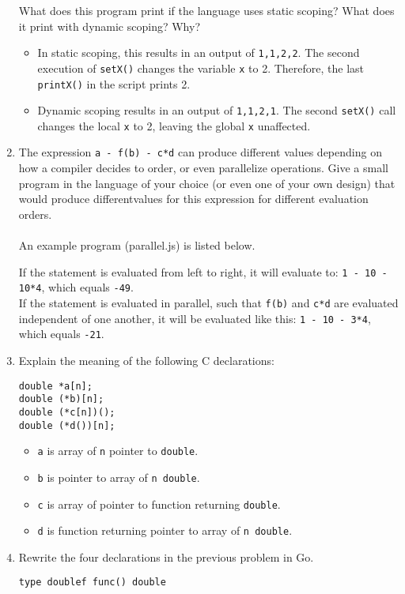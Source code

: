 \documentclass{article}
\begin{document}
\begin{enumerate}
What does this program print if the language uses static scoping? What does it print with dynamic scoping? Why? \\
\begin{itemize}
\item In static scoping, this results in an output of \texttt{1,1,2,2}. The second execution of \texttt{setX()} changes the variable \texttt{x} to 2. Therefore, the last \texttt{printX()} in the script prints 2. 
\item Dynamic scoping results in an output of \texttt{1,1,2,1}. The second \texttt{setX()} call changes the local \texttt{x} to 2, leaving the global \texttt{x} unaffected.
\end{itemize}
\pagebreak
\item The expression \texttt{a - f(b) - c*d} can produce different values depending on how a compiler decides to order, or even parallelize operations.  Give a small program in the language of your choice (or even one of your own design) that would produce differentvalues for this expression for different evaluation orders. \\\\
An example program (parallel.js) is listed below.

If the statement is evaluated from left to right, it will evaluate to: \texttt{1 - 10 - 10*4}, which equals \texttt{-49}. \\
If the statement is evaluated in parallel, such that \texttt{f(b)} and \texttt{c*d} are evaluated independent of one another,  it will be evaluated like this: \texttt{1 - 10 - 3*4}, which equals \texttt{-21}.
\pagebreak
\item Explain the meaning of the following C declarations:
\begin{verbatim}
double *a[n];  
double (*b)[n];
double (*c[n])();
double (*d())[n];
\end{verbatim}
\begin{itemize}
    \item \texttt{a} is array of \texttt{n} pointer to \texttt{double}.
    \item \texttt{b} is pointer to array of \texttt{n double}.
    \item \texttt{c} is array of pointer to function returning \texttt{double}.
    \item \texttt{d} is function returning pointer to array of \texttt{n double}.
\end{itemize}
\pagebreak
\item Rewrite the four declarations in the previous problem in Go.
\begin{verbatim}
type doublef func() double


\end{verbatim}
\end{enumerate}
\end{document}
